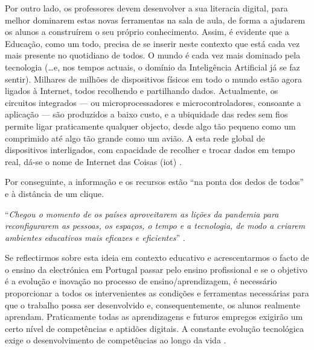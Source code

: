 Por outro lado, os professores devem desenvolver a sua literacia digital, para melhor dominarem estas novas ferramentas na sala de aula, de forma a ajudarem os alunos a construírem o seu próprio conhecimento. Assim, é evidente que a Educação, como um todo, precisa de se inserir neste contexto que está cada vez mais presente no quotidiano de todos. O mundo é cada vez mais dominado pela tecnologia (\ldots e, nos tempos actuais, o domínio da Inteligência Artificial já se faz sentir). Milhares de milhões de dispositivos físicos em todo o mundo estão agora ligados à Internet, todos recolhendo e partilhando dados. Actualmente, os circuitos integrados — ou microprocessadores e \acrfull{microcontroladores}, consoante a aplicação — são produzidos a baixo custo, e a ubiquidade das redes sem fios permite ligar praticamente qualquer objecto, desde algo tão pequeno como um comprimido até algo tão grande como um avião. A esta rede global de dispositivos interligados, com capacidade de recolher e trocar dados em tempo real, dá-se o nome de Internet das Coisas (\acrfull{iot}) \cite{IoT}.

Por conseguinte, a informação e os recursos estão “na ponta dos dedos de todos” e à distância de um clique.

\begin{center}
    ``\textit{Chegou o momento de os países aproveitarem as lições da pandemia para reconfigurarem as pessoas, os espaços, o tempo e a tecnologia, de modo a criarem ambientes educativos mais eficazes e eficientes}'' \cite{thestateofeducation}.
\end{center}

Se reflectirmos sobre esta ideia em contexto educativo e acrescentarmos o facto de o ensino da electrónica em Portugal passar pelo ensino profissional e se o objetivo é a evolução e inovação no processo de ensino/aprendizagem, é necessário proporcionar a todos os intervenientes as condições e ferramentas necessárias para que o trabalho possa ser desenvolvido e, consequentemente, os alunos realmente aprendam. Praticamente todas as aprendizagens e futuros empregos exigirão um certo nível de competências e aptidões digitais. A constante evolução tecnológica exige o desenvolvimento de competências ao longo da vida \cite{Digitale13:online}.

